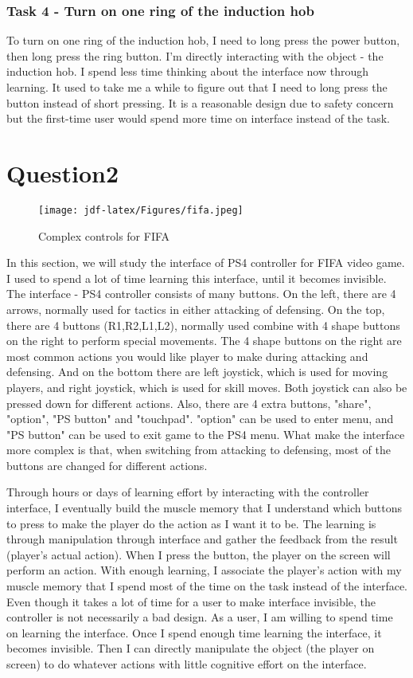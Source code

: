 \documentclass[
	letterpaper, %
]{jdf}
\begin{document}
\subsubsection{Task 4 - Turn on one ring of the induction hob}
To turn on one ring of the induction hob, I need to long press the power button, then long press the ring button. I'm directly interacting with the object - the induction hob. I spend less time thinking about the interface now through learning. It used to take me a while to figure out that I need to long press the button instead of short pressing. It is a reasonable design due to safety concern but the first-time user would spend more time on interface instead of the task.

\section{Question2}
\begin{figure}[h]
	\centering
	\texttt{[image: jdf-latex/Figures/fifa.jpeg]}
	\caption{Complex controls for FIFA}
	\label{fig:fifa}
\end{figure}
In this section, we will study the interface of PS4 controller for FIFA video game. I used to spend a lot of time learning this interface, until it becomes invisible. The interface - PS4 controller consists of many buttons. On the left, there are 4 arrows, normally used for tactics in either attacking of defensing. On the top, there are 4 buttons (R1,R2,L1,L2), normally used combine with 4 shape buttons on the right to perform special movements. The 4 shape buttons on the right are most common actions you would like player to make during attacking and defensing. And on the bottom there are left joystick, which is used for moving players, and right joystick, which is used for skill moves. Both joystick can also be pressed down for different actions. Also, there are 4 extra buttons, "share", "option", "PS button" and "touchpad". "option" can be used to enter menu, and "PS button" can be used to exit game to the PS4 menu. What make the interface more complex is that, when switching from attacking to defensing, most of the buttons are changed for different actions. 

Through hours or days of learning effort by interacting with the controller interface, I eventually build the muscle memory that I understand which buttons to press to make the player do the action as I want it to be. The learning is through manipulation through interface and gather the feedback from the result (player's actual action). When I press the button, the player on the screen will perform an action. With enough learning, I associate the player's action with my muscle memory that I spend most of the time on the task instead of the interface. Even though it takes a lot of time for a user to make interface invisible, the controller is not necessarily a bad design. As a user, I am willing to spend time on learning the interface. Once I spend enough time learning the interface, it becomes invisible. Then I can directly manipulate the object (the player on screen) to do whatever actions with little cognitive effort on the interface.
\end{document}
